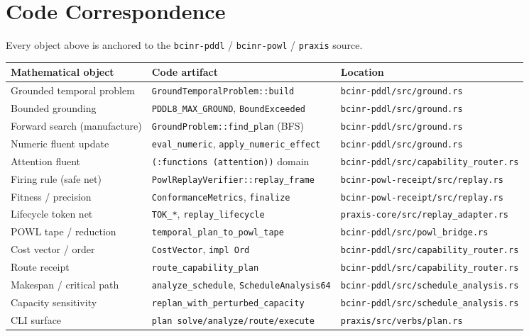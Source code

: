 \documentclass[11pt,oneside]{book}
\theoremstyle{definition}
\theoremstyle{plain}
\theoremstyle{remark}
\newcommand{\code}[1]{\texttt{#1}}
\begin{document}
\chapter{Code Correspondence}
Every object above is anchored to the \code{bcinr-pddl} / \code{bcinr-powl} / \code{praxis} source.
\begin{center}
\begin{tabular}{lll}
\toprule
Mathematical object & Code artifact & Location \\
\midrule
Grounded temporal problem & \code{GroundTemporalProblem::build} & \code{bcinr-pddl/src/ground.rs} \\
Bounded grounding & \code{PDDL8\_MAX\_GROUND}, \code{BoundExceeded} & \code{bcinr-pddl/src/ground.rs} \\
Forward search (manufacture) & \code{GroundProblem::find\_plan} (BFS) & \code{bcinr-pddl/src/ground.rs} \\
Numeric fluent update & \code{eval\_numeric}, \code{apply\_numeric\_effect} & \code{bcinr-pddl/src/ground.rs} \\
Attention fluent & \code{(:functions (attention))} domain & \code{bcinr-pddl/src/capability\_router.rs} \\
Firing rule (safe net) & \code{PowlReplayVerifier::replay\_frame} & \code{bcinr-powl-receipt/src/replay.rs} \\
Fitness / precision & \code{ConformanceMetrics}, \code{finalize} & \code{bcinr-powl-receipt/src/replay.rs} \\
Lifecycle token net & \code{TOK\_*}, \code{replay\_lifecycle} & \code{praxis-core/src/replay\_adapter.rs} \\
POWL tape / reduction & \code{temporal\_plan\_to\_powl\_tape} & \code{bcinr-pddl/src/powl\_bridge.rs} \\
Cost vector / order & \code{CostVector}, \code{impl Ord} & \code{bcinr-pddl/src/capability\_router.rs} \\
Route receipt & \code{route\_capability\_plan} & \code{bcinr-pddl/src/capability\_router.rs} \\
Makespan / critical path & \code{analyze\_schedule}, \code{ScheduleAnalysis64} & \code{bcinr-pddl/src/schedule\_analysis.rs} \\
Capacity sensitivity & \code{replan\_with\_perturbed\_capacity} & \code{bcinr-pddl/src/schedule\_analysis.rs} \\
CLI surface & \code{plan solve/analyze/route/execute} & \code{praxis/src/verbs/plan.rs} \\
\bottomrule
\end{tabular}
\end{center}
\end{document}
